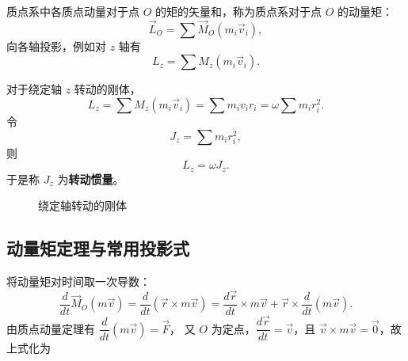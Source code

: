 
质点系中各质点动量对于点 $O$ 的矩的矢量和，称为质点系对于点 $O$ 的动量矩：
\begin{equation}\label{eq:12-lo-system}
  \vec{L}_O=\sum\vec{M}_O(m_i\vec{v}_i),
\end{equation}
向各轴投影，例如对 $z$ 轴有
\begin{equation}\label{eq:12-lz-system}
  L_z=\sum M_z(m_i\vec{v}_i).
\end{equation}


对于绕定轴 $z$ 转动的刚体，
\begin{equation}\label{eq:12-rigid-lz}
  L_z=\sum M_z(m_i\vec{v}_i)=\sum m_iv_ir_i=\omega\sum m_ir_i^2.
\end{equation}
令
\begin{equation}\label{eq:12-jz-def}
  J_z=\sum m_ir_i^2,
\end{equation}
则
\begin{equation}\label{eq:12-lz-jz}
  L_z=\omega J_z.
\end{equation}
于是称 $J_z$ 为\textbf{转动惯量}。

\begin{figure}[htbp]
\centering
{}
\caption{绕定轴转动的刚体}\label{fig:12-fixedaxis}
\end{figure}

\subsection{动量矩定理与常用投影式}

将动量矩对时间取一次导数：
\begin{equation}\label{eq:12-theorem-expand}
  \frac{d}{dt}\vec{M}_O(m\vec{v})
  =\frac{d}{dt}\left(\vec{r}\times m\vec{v}\right)
  =\frac{d\vec{r}}{dt}\times m\vec{v}+\vec{r}\times\frac{d}{dt}(m\vec{v}).
\end{equation}
由质点动量定理有 $\dfrac{d}{dt}(m\vec{v})=\vec{F}$，
又 $O$ 为定点，$\dfrac{d\vec{r}}{dt}=\vec{v}$，且 $\vec{v}\times m\vec{v}=\vec{0}$，故上式化为

